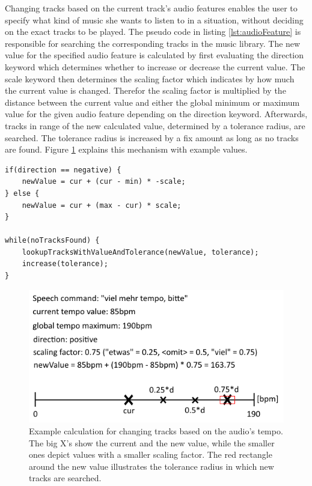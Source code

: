 Changing tracks based on the current track's audio features enables the user to specify what kind of music she wants to listen to in a situation, without deciding on the exact tracks to be played. The pseudo code in listing \ref{lst:audioFeature} is responsible for searching the corresponding tracks in the music library. The new value for the specified audio feature is calculated by first evaluating the direction keyword which determines whether to increase or decrease the current value. The scale keyword then determines the scaling factor which indicates by how much the current value is changed. Therefor the scaling factor is multiplied by the distance between the current value and either the global minimum or maximum value for the given audio feature depending on the direction keyword. Afterwards, tracks in  range of the new calculated value, determined by a tolerance radius, are searched. The tolerance radius is increased by a fix amount as long as no tracks are found. Figure \ref{fig:audioFeatureExample} explains this mechanism with example values.

\begin{lstlisting}[caption=Pseudo code for calculating the new audio feature value and looking up respective tracks with a tolerance radius from the music library, label=lst:audioFeature]
if(direction == negative) {
	newValue = cur + (cur - min) * -scale;
} else {
	newValue = cur + (max - cur) * scale;
}

while(noTracksFound) {
	lookupTracksWithValueAndTolerance(newValue, tolerance);
	increase(tolerance);
}
\end{lstlisting}

\begin{figure}[bth]
	\myfloatalign
	\includegraphics[width=.99\linewidth]{img/calcAudioFeatureExample.png}
	\caption{Example calculation for changing tracks based on the audio's tempo. The big X's show the current and the new value, while the smaller ones depict values with a smaller scaling factor. The red rectangle around the new value illustrates the tolerance radius in which new tracks are searched.}
	\label{fig:audioFeatureExample}
\end{figure}

